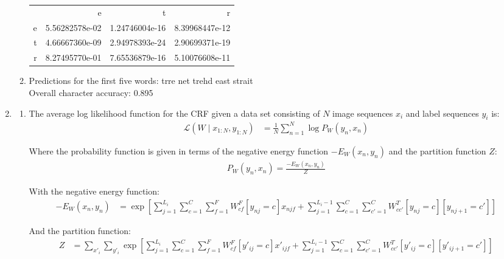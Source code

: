 \documentclass[12pt]{article}
\begin{document}
\begin{enumerate}
\begin{enumerate}
\begin{center}
\begin{tabular}{rrrr}
& e & t & r \\
e & 5.56282578e-02 & 1.24746004e-16 & 8.39968447e-12 \\
t & 4.66667360e-09 & 2.94978393e-24 & 2.90699371e-19 \\
r & 8.27495770e-01 & 7.65536879e-16 & 5.10076608e-11
\end{tabular}
\end{center}

\item %
Predictions for the first five words: trre net trehd east strait\\
Overall character accuracy: 0.895
\end{enumerate}

\item %
\begin{enumerate}
\item %
The average log likelihood function for the CRF given a data set consisting of $N$ image sequences $x_i$ and label sequences $y_i$ is:
\begin{align*}
\mathcal{L}(W\mid x_{1:N},y_{1:N}) &= \frac{1}{N}\sum_{n=1}^N\log P_W(y_n,x_n)
\end{align*} 

Where the probability function is given in terms of the negative energy function $-E_W(x_n,y_n)$ and the partition function $Z$:
\begin{align*}
P_W(y_n,x_n) = \frac{-E_W(x_n,y_n)}{Z}
\end{align*}

With the negative energy function:
\begin{align*}
-E_W(x_n,y_n) &= \exp\left[
\sum_{j=1}^{L_i}\sum_{c=1}^C\sum_{f=1}^FW_{cf}^F[y_{nj}=c]x_{njf}
+ \sum_{j=1}^{L_i-1}\sum_{c=1}^C\sum_{c'=1}^CW_{cc'}^T[y_{nj}=c][y_{nj+1}=c']
\right]
\end{align*}

And the partition function:
\begin{align*}
Z &= \sum_{x'_i}\sum_{y'_i}\exp\left[
\sum_{j=1}^{L_i}\sum_{c=1}^C\sum_{f=1}^FW_{cf}^F[y'_{ij}=c]x'_{ijf}
+ \sum_{j=1}^{L_i-1}\sum_{c=1}^C\sum_{c'=1}^CW_{cc'}^T[y'_{ij}=c][y'_{ij+1}=c']
\right]
\end{align*}


\end{enumerate}
\end{enumerate}
\end{document}
